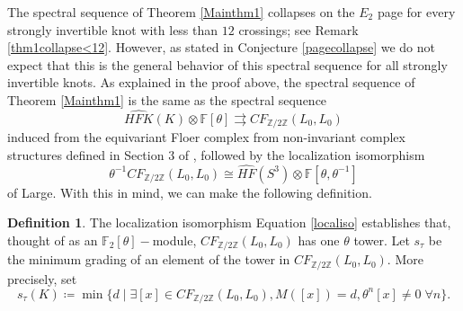\documentclass[11pt]{amsart}
\theoremstyle{definition}
\newtheorem{definition}[theorem]{Definition}
\theoremstyle{remark}
\def\F{\mathbb{F}}
\def\Z{\mathbb{Z}}
\def\HF {\mathit{HF}}
\def\HFK {\mathit{HFK}}
\newcommand\HFKhat{\widehat{\HFK}}
\newcommand\HFhat{\widehat{\HF}}
\numberwithin{equation}{section}
\begin{document}
The spectral sequence of Theorem \ref{Mainthm1} collapses on the $E_2$ page for every strongly invertible knot with less than $12$ crossings; see Remark \ref{thm1collapse<12}. However, as stated in Conjecture \ref{pagecollapse} we do not expect that this is the general behavior of this spectral sequence for all strongly invertible knots.
As explained in the proof above, the spectral sequence of Theorem \ref{Mainthm1} is the same as the spectral sequence \begin{equation}\label{ss3}\HFKhat(K)\otimes \F[\theta]\rightrightarrows CF_{\Z/2\Z}(L_0, L_0)\end{equation}induced from the equivariant Floer complex from non-invariant complex structures defined in Section 3 of \cite{Hendricks_2016}, followed by the localization isomorphism 
\begin{equation}\label{localiso}\theta^{-1}CF_{\Z/2\Z}(L_0, L_0)\cong \HFhat(S^3)\otimes \F[\theta,\theta^{-1}]\end{equation} of Large. With this in mind, we can make the following definition.


\begin{definition}
    The localization isomorphism Equation \ref{localiso} establishes that, thought of as an $\F_2[\theta]-$module, $CF_{\Z/2\Z}(L_0, L_0)$ has one $\theta$ tower. Let $s_\tau$ be the minimum grading of an element of the tower in $CF_{\Z/2\Z}(L_0, L_0)$. More precisely, set
    \[s_\tau(K)\coloneq \min\{d\;|\;\exists [x]\in CF_{\Z/2\Z}(L_0, L_0), M([x])=d, \theta^n[x]\neq 0\;\forall n\}.\]
\end{definition}
\end{document}
